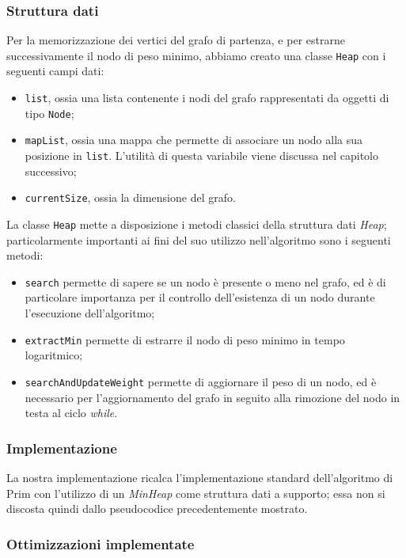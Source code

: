 \subsubsection{Struttura dati}

Per la memorizzazione dei vertici del grafo di partenza, e per estrarne successivamente il nodo di peso minimo, abbiamo 
creato una classe \texttt{Heap} con i seguenti campi dati:
\begin{itemize}
    \item \texttt{list}, ossia una lista contenente i nodi del grafo rappresentati da oggetti di tipo \texttt{Node};
    \item \texttt{mapList}, ossia una mappa che permette di associare un nodo alla sua posizione in \texttt{list}. L'utilità
    di questa variabile viene discussa nel capitolo successivo;
    \item \texttt{currentSize}, ossia la dimensione del grafo.
\end{itemize}
La classe \texttt{Heap} mette a disposizione i metodi classici della struttura dati \textit{Heap}; particolarmente importanti 
ai fini del suo utilizzo nell'algoritmo sono i seguenti metodi:
\begin{itemize}
    \item \texttt{search} permette di sapere se un nodo è presente o meno nel grafo, ed è di particolare importanza
    per il controllo dell'esistenza di un nodo durante l'esecuzione dell'algoritmo;
    \item \texttt{extractMin} permette di estrarre il nodo di peso minimo in tempo logaritmico;
    \item \texttt{searchAndUpdateWeight} permette di aggiornare il peso di un nodo, ed è necessario
    per l'aggiornamento del grafo in seguito alla rimozione del nodo in testa al ciclo \textit{while}.
\end{itemize}

\subsubsection{Implementazione}

La nostra implementazione ricalca l'implementazione standard dell'algoritmo di Prim con l'utilizzo di un 
\textit{MinHeap} come struttura dati a supporto; essa non si discosta quindi dallo pseudocodice precedentemente mostrato.

\subsubsection{Ottimizzazioni implementate}

